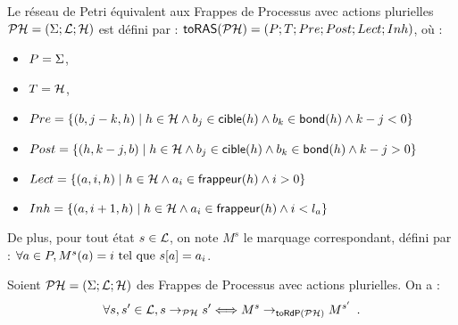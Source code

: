 \begin{definition}
  Le réseau de Petri équivalent aux Frappes de Processus
  avec actions plurielles $\mathcal{PH} = (\Sigma; \mathcal{L}; \mathcal{H})$
  est défini par : $\mathsf{toRAS}(\mathcal{PH}) = (P; T; Pre; Post; Lect; Inh)$, où :
  \begin{itemize}
    \item $P = \Sigma$,
    \item $T = \mathcal{H}$,
    \item $Pre = \{ (b, j-k, h) \mid h \in \mathcal{H} \wedge b_j \in \mathsf{cible}(h) \wedge
      b_k \in \mathsf{bond}(h) \wedge k-j < 0 \}$
    \item $Post = \{ (h, k-j, b) \mid h \in \mathcal{H} \wedge b_j \in \mathsf{cible}(h) \wedge
      b_k \in \mathsf{bond}(h) \wedge k-j > 0 \}$
    \item $Lect = \{ (a, i, h) \mid h \in \mathcal{H} \wedge a_i \in \mathsf{frappeur}(h) \wedge i > 0 \}$
    \item $Inh = \{ (a, i+1, h) \mid h \in \mathcal{H} \wedge a_i \in \mathsf{frappeur}(h) \wedge i < l_a \}$
  \end{itemize}
  De plus, pour tout état $s \in \mathcal{L}$, on note
  $M^s$ le marquage correspondant, défini par :
  $\forall a \in P, M^s(a) = i \text{ tel que } {s[a]} = a_i$.
\end{definition}

\begin{theorem}[$\PH \approx \phmtopt$]
  Soient $\mathcal{PH} = (\Sigma; \mathcal{L}; \mathcal{H})$ des Frappes de Processus avec actions plurielles.
  On a :
  \[\forall s, s' \in \mathcal{L}, s \rightarrow_{\mathcal{PH}} s' \Longleftrightarrow
    M^s \rightarrow_{\mathsf{toRdP}(\mathcal{PH})} M^{s'} \enspace.\]
\end{theorem}

